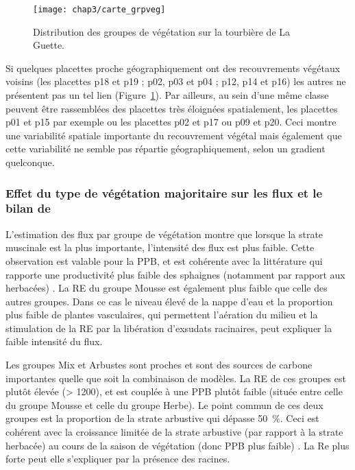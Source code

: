 \begin{figure}
\centering
\texttt{[image: chap3/carte\_grpveg]}
\caption{Distribution des groupes de végétation sur la tourbière de La Guette.}
\label{fig:carte_grpveg}
\end{figure}

Si quelques placettes proche géographiquement ont des recouvrements végétaux voisins (les placettes p18 et p19 ; p02, p03 et p04 ; p12, p14 et p16) les autres ne présentent pas un tel lien (Figure~\ref{fig:carte_grpveg}).
Par ailleurs, au sein d'une même classe peuvent être rassemblées des placettes très éloignées spatialement, les placettes p01 et p15 par exemple ou les placettes p02 et p17 ou p09 et p20.
Ceci montre une variabilité spatiale importante du recouvrement végétal mais également que cette variabilité ne semble pas répartie géographiquement, selon un gradient quelconque.

\subsubsection{Effet du type de végétation majoritaire sur les flux et le bilan de \coo}

L'estimation des flux par groupe de végétation montre que lorsque la strate muscinale est la plus importante, l'intensité des flux est plus faible.
Cette observation est valable pour la PPB, et est cohérente avec la littérature qui rapporte une productivité plus faible des sphaignes (notamment par rapport aux herbacées) \citep{rydin2013b,beyer2015}. 
La RE du groupe Mousse est également plus faible que celle des autres groupes.
Dans ce cas le niveau élevé de la nappe d'eau et la proportion plus faible de plantes vasculaires, qui permettent l'aération du milieu et la stimulation de la RE par la libération d'exsudats racinaires, peut expliquer la faible intensité du flux.

Les groupes Mix et Arbustes sont proches et sont des sources de carbone importantes quelle que soit la combinaison de modèles.
La RE de ces groupes est plutôt élevée (> \SI{1200}{\gcma}), et est couplée à une PPB plutôt faible (située entre celle du groupe Mousse et celle du groupe Herbe).
Le point commun de ces deux groupes est la proportion de la strate arbustive qui dépasse \SI{50}{\percent}.
Ceci est cohérent avec la croissance limitée de la strate arbustive (par rapport à la strate herbacée) au cours de la saison de végétation (donc PPB plus faible) \citep{rydin2013b}.
La Re plus forte peut elle s'expliquer par la présence des racines.

